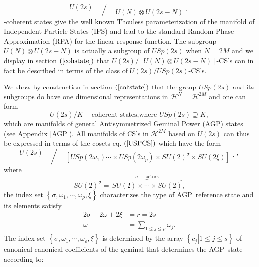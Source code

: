 \documentclass[aps,preprint]{revtex4}%
\begin{document}
\begin{equation}
U\left(  2s\right)
\genfrac{/}{.}{0pt}{}{{}}{U\left(  N\right)  \otimes U\left(  2s-N\right)  }%
\end{equation}
-coherent states give the well known Thouless parameterization \cite{thouless}
of the manifold of Independent Particle States (IPS) and lead to the standard
Random Phase Approximation (RPA) for the linear response function. The
subgroup $U\left(  N\right)  \otimes U\left(  2s-N\right)  $ is actually a
subgroup of $USp\left(  2s\right)  $ when $N=2M$ and we display in section
$\left(  \ref{cohstate}\right)  $ that $U\left(  2s\right)  /\left[  U\left(
N\right)  \otimes U\left(  2s-N\right)  \right]  $-CS's can in fact be
described in terms of the class of $U\left(  2s\right)  /USp\left(  2s\right)
$-CS's.

We show by construction in section $\left(  \ref{cohstate}\right)  $ that the
group $USp\left(  2s\right)  $ and its subgroups do have one dimensional
representations in $\mathcal{H}^{N}=\mathcal{H}^{2M}$ and one can form
\begin{equation}
U\left(  2s\right)  /K-\text{coherent states,where }USp\left(  2s\right)
\supseteq K,\label{USPCS}%
\end{equation}
which are manifolds of general Antisymmetrized Geminal Power (AGP) states (see
Appendix \ref{AGP}). All manifolds of CS's in $\mathcal{H}^{2M}$ based on
$U\left(  2s\right)  $ can thus be expressed in terms of the cosets eq.
$\left(  \ref{USPCS}\right)  $ which have the form
\begin{equation}
U\left(  2s\right)
\genfrac{/}{.}{0pt}{}{{}}{\left[  USp\left(  2\omega_{1}\right)  \cdots\times
USp\left(  2\omega_{p}\right)  \times SU\left(  2\right)  ^{\sigma}\times
SU\left(  2\xi\right)  \right]  }%
,
\end{equation}
where
\begin{equation}
SU\left(  2\right)  ^{\sigma}=\,\overset{\sigma-\text{factors}}{\overbrace
{SU\left(  2\right)  \times\cdots\times SU\left(  2\right)  }},
\end{equation}
the index set $\left\{  \sigma,\omega_{1},\cdots,\omega_{\rho},\xi\right\}  $
characterizes the type of AGP\ reference state and its elements satisfy
\begin{align}
2\sigma+2\omega+2\xi &  =r=2s\nonumber\\
\omega &  =\sum_{1\leq j\leq\rho}\omega_{j}.
\end{align}
The index set $\left\{  \sigma,\omega_{1},\cdots,\omega_{\rho},\xi\right\}  $
is determined by the array $\left\{  \left.  c_{j}\right\vert 1\leq j\leq
s\right\}  $ of canonical canonical coefficients \cite{weiner2003} of the
geminal that determines the AGP\ state according to:
\end{document}
